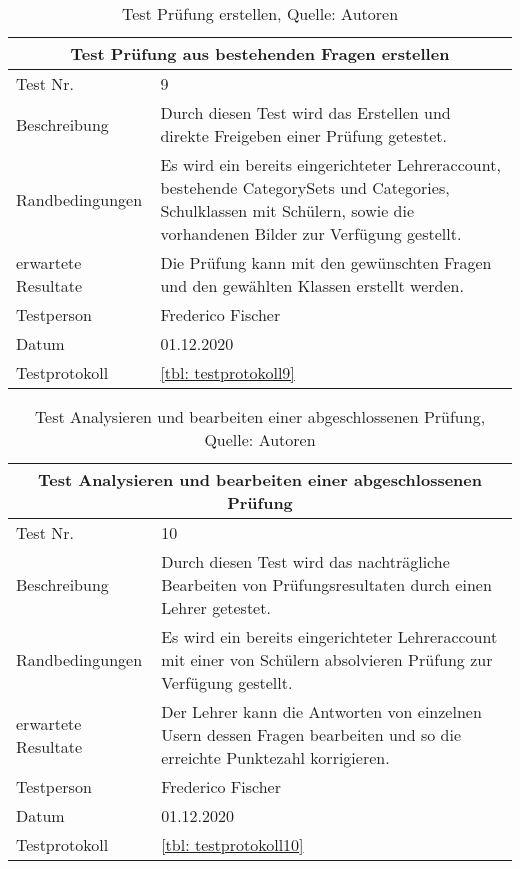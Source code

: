 \begin{table}[H]
\begin{tabularx}{\textwidth}{lX}
  \hline
  \multicolumn{2}{|c|}{Test Prüfung aus bestehenden Fragen erstellen} \\
  \hline
  Test Nr. & 9\\
  Beschreibung & Durch diesen Test wird das Erstellen und direkte Freigeben einer Prüfung getestet. \\
  Randbedingungen & Es wird ein bereits eingerichteter Lehreraccount,  bestehende CategorySets und Categories,  Schulklassen mit Schülern,  sowie die vorhandenen Bilder zur Verfügung gestellt. \\
  erwartete Resultate &  Die Prüfung kann mit den gewünschten Fragen und den gewählten Klassen erstellt werden.  \\
  Testperson & Frederico Fischer \\
  Datum & 01.12.2020 \\
  Testprotokoll & \ref{tbl: testprotokoll9}\\
   \hline
\end{tabularx}
\caption{ \label{tbl: Test Pruefung erstellen}Test Prüfung erstellen,  Quelle: Autoren}
\end{table}

\begin{table}[H]
\begin{tabularx}{\textwidth}{lX}
  \hline
  \multicolumn{2}{|c|}{Test Analysieren und bearbeiten einer abgeschlossenen Prüfung} \\
  \hline
  Test Nr. & 10\\
  Beschreibung & Durch diesen Test wird das nachträgliche Bearbeiten von Prüfungsresultaten durch einen Lehrer getestet. \\
  Randbedingungen & Es wird ein bereits eingerichteter Lehreraccount mit einer von Schülern absolvieren Prüfung zur Verfügung gestellt.  \\
  erwartete Resultate & Der Lehrer kann die Antworten von einzelnen Usern dessen Fragen bearbeiten und so die erreichte Punktezahl korrigieren.   \\
  Testperson & Frederico Fischer \\
  Datum & 01.12.2020 \\
  Testprotokoll & \ref{tbl: testprotokoll10}\\
   \hline
\end{tabularx}
\caption{ \label{tbl: Test Analysieren und bearbeiten einer abgeschlossenen Pruefung}Test Analysieren und bearbeiten einer abgeschlossenen Prüfung, Quelle: Autoren}
\end{table}

